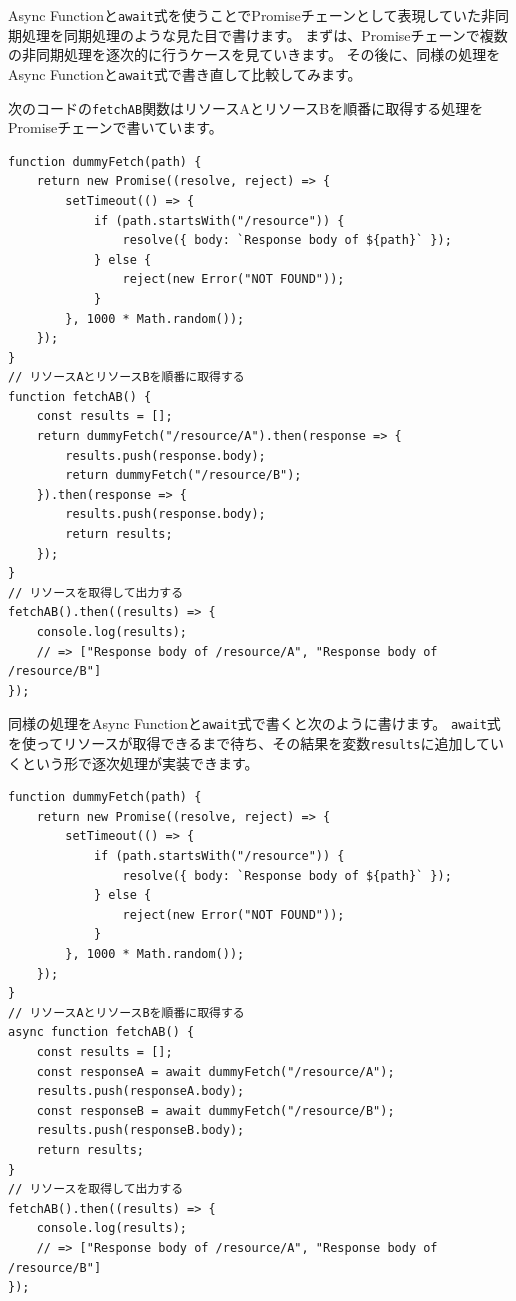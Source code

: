 Async
Functionと\texttt{await}式を使うことでPromiseチェーンとして表現していた非同期処理を同期処理のような見た目で書けます。
まずは、Promiseチェーンで複数の非同期処理を逐次的に行うケースを見ていきます。
その後に、同様の処理をAsync
Functionと\texttt{await}式で書き直して比較してみます。

次のコードの\texttt{fetchAB}関数はリソースAとリソースBを順番に取得する処理をPromiseチェーンで書いています。

\begin{lstlisting}
function dummyFetch(path) {
    return new Promise((resolve, reject) => {
        setTimeout(() => {
            if (path.startsWith("/resource")) {
                resolve({ body: `Response body of ${path}` });
            } else {
                reject(new Error("NOT FOUND"));
            }
        }, 1000 * Math.random());
    });
}
// リソースAとリソースBを順番に取得する
function fetchAB() {
    const results = [];
    return dummyFetch("/resource/A").then(response => {
        results.push(response.body);
        return dummyFetch("/resource/B");
    }).then(response => {
        results.push(response.body);
        return results;
    });
}
// リソースを取得して出力する
fetchAB().then((results) => {
    console.log(results); 
    // => ["Response body of /resource/A", "Response body of /resource/B"]
});
\end{lstlisting}

同様の処理をAsync
Functionと\texttt{await}式で書くと次のように書けます。
\texttt{await}式を使ってリソースが取得できるまで待ち、その結果を変数\texttt{results}に追加していくという形で逐次処理が実装できます。

\begin{lstlisting}
function dummyFetch(path) {
    return new Promise((resolve, reject) => {
        setTimeout(() => {
            if (path.startsWith("/resource")) {
                resolve({ body: `Response body of ${path}` });
            } else {
                reject(new Error("NOT FOUND"));
            }
        }, 1000 * Math.random());
    });
}
// リソースAとリソースBを順番に取得する
async function fetchAB() {
    const results = [];
    const responseA = await dummyFetch("/resource/A");
    results.push(responseA.body);
    const responseB = await dummyFetch("/resource/B");
    results.push(responseB.body);
    return results;
}
// リソースを取得して出力する
fetchAB().then((results) => {
    console.log(results); 
    // => ["Response body of /resource/A", "Response body of /resource/B"]
});
\end{lstlisting}

